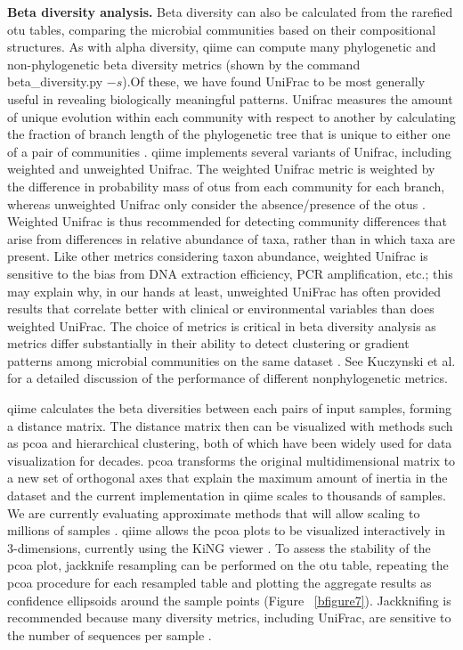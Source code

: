 \textbf{Beta diversity analysis.} Beta diversity can also be calculated from the rarefied \gls{otu} tables, comparing the
microbial communities based on their compositional structures. As with alpha diversity,
\gls{qiime} can compute many phylogenetic and non-phylogenetic beta diversity metrics (shown
by the command beta\_diversity.py $-s$).Of these, we have found UniFrac to be most
generally useful in revealing biologically meaningful patterns. Unifrac measures
the amount of unique evolution within each community with respect to another by
calculating the fraction of branch length of the phylogenetic tree that is unique
to either one of a pair of communities \cite{Lozupone2005}. \gls{qiime} implements several
variants of Unifrac, including weighted and unweighted Unifrac. The weighted Unifrac
metric is weighted by the difference in probability mass of \gls{otu}s from each community
for each branch, whereas unweighted Unifrac only consider the absence/presence of the
\gls{otu}s \cite{Lozupone2007}. Weighted Unifrac is thus recommended for detecting community
differences that arise from differences in relative abundance of taxa, rather than in
which taxa are present. Like other metrics considering taxon abundance, weighted Unifrac
is sensitive to the bias from DNA extraction efficiency, PCR amplification, etc.; this may
explain why, in our hands at least, unweighted UniFrac has often provided results that
correlate better with clinical or environmental variables than does weighted UniFrac.
The choice of metrics is critical in beta diversity analysis as metrics differ substantially
in their ability to detect clustering or gradient patterns among microbial communities on
the same dataset \cite{Arumugam2011, Ravel2012, Schloss2006}. See
Kuczynski et al. \cite{Kuczynski2010Patterns} for a detailed discussion of the performance
of different nonphylogenetic metrics.

\gls{qiime} calculates the beta diversities between each pairs of input samples, forming a
distance matrix. The distance matrix then can be visualized with methods such as \gls{pcoa}
and hierarchical clustering, both of which have been widely used for data visualization
for decades. \gls{pcoa} transforms the original multidimensional matrix to a new set of
orthogonal axes that explain the maximum amount of inertia in the dataset and the
current implementation in \gls{qiime} scales to thousands of samples. We are currently
evaluating approximate methods that will allow scaling to millions of samples \cite{Gonzalez2012}.
\gls{qiime} allows the \gls{pcoa} plots to be visualized interactively in 3-dimensions,
currently using the KiNG viewer \cite{Chen2009}. To assess the stability of the \gls{pcoa} plot,
jackknife resampling can be performed on the \gls{otu} table, repeating the \gls{pcoa} procedure for
each resampled table and plotting the aggregate results as confidence ellipsoids around
the sample points (Figure ~\ref{bfigure7}). Jackknifing is recommended because many diversity
metrics, including UniFrac, are sensitive to the number of sequences per sample \cite{Lozupone2011}.

